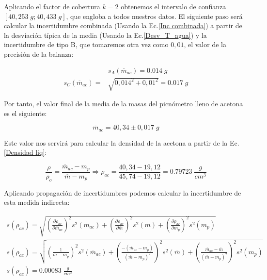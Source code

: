 \documentclass[a4paper,12pt,titlepage]{article}
\begin{document}
Aplicando el factor de cobertura $k=2$ obtenemos el intervalo de confianza $[40,253 \; g ; 40,433 \; g]$, que engloba a todos nuestros datos. El siguiente paso será calcular la incertidumbre combinada (Usando la Ec.\ref{Inc combinada}) a partir de la desviación típica de la media (Usando la Ec.\ref{Desv_T_agua}) y la incertidumbre de tipo B, que tomaremos otra vez como $0,01$, el valor de la precisión de la balanza:

\begin{align}
    &s_{A}(\overline{m}_{ac}) = 0.014 \; g \\
    s_{C}(\overline{m}_{ac}) = &\sqrt{0,014^2 + 0,01^2} = 0.017 \; g
\end{align}

Por tanto, el valor final de la media de la masas del picnómetro lleno de acetona es el siguiente:

\begin{equation}
    \overline{m}_{ac} = 40,34 \pm 0,017 \; g
\end{equation}

Este valor nos servirá para calcular la densidad de la acetona a partir de la Ec.\ref{Densidad liq}:

\begin{equation}
    \frac{\rho}{\rho_o}=\frac{\overline{m}_{ac}-m_{p}}{\overline{m}-m_{p}} \Rightarrow \rho_{ac} = \frac{40,34-19,12}{45,74-19,12} = 0.79723 \; \frac{g}{cm^3}
\end{equation}

Aplicando propagación de incertidumbres podemos calcular la incertidumbre de esta medida indirecta:

\begin{gather}
    s(\rho_{ac}) = \sqrt{\left (\frac{\partial \rho_{ac}}{\partial \overline{m}_{ac}} \right )^2 s^2(\overline{m}_{ac})  +  \left (\frac{\partial \rho_{ac}}{\partial \overline{m}} \right )^2 s^2(\overline{m})  +  \left (\frac{\partial \rho_{ac}}{\partial m_{p}} \right )^2 s^2(m_{p})} \\
    s(\rho_{ac}) = \sqrt{\left (\frac{1}{\overline{m}-m_{p}} \right )^2 s^2(\overline{m}_{ac})  +  \left (\frac{-(\overline{m}_{ac}-m_{p})}{(\overline{m}-m_{p})^2} \right )^2 s^2(\overline{m})  +  \left (\frac{\overline{m}_{ac}-\overline{m}}{(\overline{m}-m_{p})^2} \right )^2 s^2(m_{p})} \nonumber  \\
    s(\rho_{ac}) = 0.00083 \; \frac{g}{cm^3} \nonumber
    \label{Inceridumbre densidad liq}
\end{gather}
\end{document}
